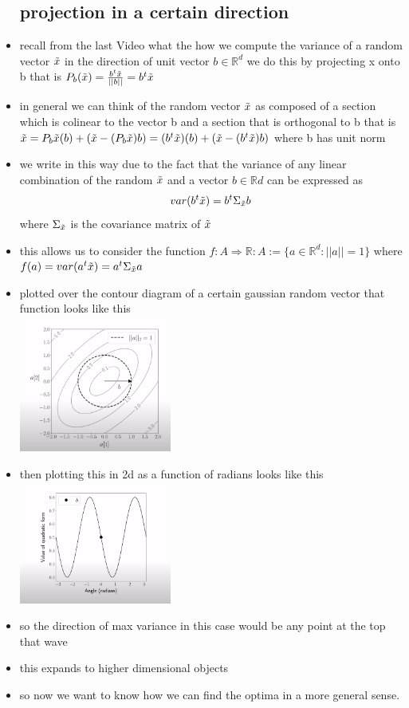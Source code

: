 \documentclass{article}
\begin{document}
\begin{itemize}
\subsection*{projection in a certain direction}
\item recall from the last Video what the how we compute the variance of a random vector $\Tilde{x}$ in the direction of unit vector $b\in \mathbb{R}^{d}$ we do this by projecting x onto b that is $P_{b}(\Tilde{x})=\frac{b^{t}\Tilde{x}}{||b||}=b^{t}\Tilde{x}$
\item in general we can think of the random vector $\Tilde{x}$ as composed of a section which is colinear to the vector b and a section that is orthogonal to b that is $\Tilde{x}=P_{b}\Tilde{x}(b)+(\Tilde{x}-(P_{b}\Tilde{x})b)=(b^{t}\Tilde{x})(b)+(\Tilde{x}-(b^{t}\Tilde{x})b)$ where b has unit norm 
\item we write in this way due to the fact that the variance of any linear combination of the random $\Tilde{x}$ and a vector $b\in \mathbb{R}{d}$ can be expressed as $$var(b^{t}\Tilde{x})=b^t\Sigma_{\Tilde{x}}b$$ where $\Sigma_{\Tilde{x}}$ is the covariance matrix of $\Tilde{x}$
\item this allows us to consider the function $f:A\Rightarrow\mathbb{R}: A:=\{a\in \mathbb{R}^{d} : ||a||=1\}$ where
 $f(a)=var(a^t\Tilde{x})=a^{t}\Sigma_{\Tilde{x}}a$
\item plotted over the contour diagram of a certain gaussian random vector that function looks
 like this \\ \includegraphics[width=5cm]{notes/week_8/vedio_2/immages/v2_1.png}
\item then plotting this in 2d as a function of radians looks like this 
 \\ \includegraphics[width=5cm]{notes/week_8/vedio_2/immages/v2_2.png}
 \item so the direction of max variance in this case would be any point at the top that wave
 \item this expands to higher dimensional objects
 \item so now we want to know how we can find the optima in a more general sense. 

\end{itemize}
\end{document}
